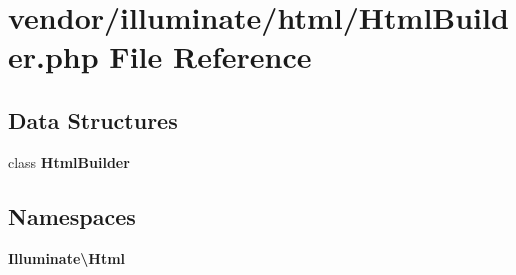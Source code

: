 \section{vendor/illuminate/html/\+Html\+Builder.php File Reference}
\label{_html_builder_8php}
\subsection*{Data Structures}
\begin{DoxyCompactItemize}
\item 
class {\bf Html\+Builder}
\end{DoxyCompactItemize}
\subsection*{Namespaces}
\begin{DoxyCompactItemize}
\item 
 {\bf Illuminate\textbackslash{}\+Html}
\end{DoxyCompactItemize}
